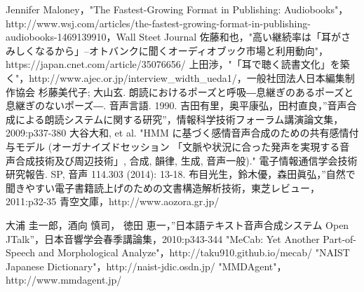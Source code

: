 \begin{thebibliography}{99}
 Jennifer Maloney，"The Fastest-Growing Format in Publishing: Audiobooks"，http://www.wsj.com/articles/the-fastest-growing-format-in-publishing-audiobooks-1469139910，Wall Steet Journal
 佐藤和也，"高い継続率は「耳がさみしくなるから」--オトバンクに聞くオーディオブック市場と利用動向"，https://japan.cnet.com/article/35076656/
 上田渉，"「耳で聴く読書文化」を築く"，http://www.ajec.or.jp/interview\_width\_ueda1/，一般社団法人日本編集制作協会
 杉藤美代子; 大山玄. 朗読におけるポーズと呼吸―息継ぎのあるポーズと息継ぎのないポーズ―. 音声言語. 1990.
 吉田有里，奥平康弘，田村直良，”音声合成による朗読システムに関する研究”，情報科学技術フォーラム講演論文集，2009:p337-380
 大谷大和, et al. "HMM に基づく感情音声合成のための共有感情付与モデル (オーガナイズドセッション 「文脈や状況に合った発声を実現する音声合成技術及び周辺技術」, 合成, 韻律, 生成, 音声一般)." 電子情報通信学会技術研究報告. SP, 音声 114.303 (2014): 13-18.
 布目光生，鈴木優，森田眞弘，”自然で聞きやすい電子書籍読上げのための文書構造解析技術，東芝レビュー，2011:p32-35
 青空文庫，http://www.aozora.gr.jp/

 大浦 圭一郎，酒向 慎司， 徳田 恵一，”日本語テキスト音声合成システム Open JTalk”，日本音響学会春季講論集，2010:p343-344
 "MeCab: Yet Another Part-of-Speech and Morphological Analyze"，http://taku910.github.io/mecab/
 "NAIST Japanese Dictionary"，http://naist-jdic.osdn.jp/
 "MMDAgent"，http://www.mmdagent.jp/


\end{thebibliography}
